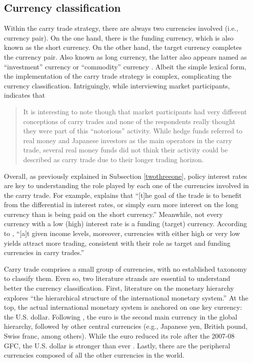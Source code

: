 \documentclass[a4paper, twoside]{templates/ociamthesis}
\begin{document}
\hypertarget{twothreefive}{%
\subsection{Currency classification}\label{twothreefive}}

\noindent Within the carry trade strategy, there are always two currencies involved (i.e., currency pair). On the one hand, there is the funding currency, which is also known as the short currency. On the other hand, the target currency completes the currency pair. Also known as long currency, the latter also appears named as ``investment'' currency \autocite[e.g.,][ 313]{brunnermeier2008} or ``commodity'' currency \autocite[ 80]{rossi2012}. Albeit the simple lexical form, the implementation of the carry trade strategy is complex, complicating the currency classification. Intriguingly, while interviewing market participants, \textcite[ 220]{kaltenbrunner2011} indicates that

\begin{quote}
It is interesting to note though that market participants had very different conceptions of carry trades and none of the respondents really thought they were part of this ``notorious'' activity. While hedge funds referred to real money and Japanese investors as the main operators in the carry trade, several real money funds did not think their activity could be described as carry trade due to their longer trading horizon.
\end{quote}

Overall, as previously explained in Subsection \ref{twothreeone}, policy interest rates are key to understanding the role played by each one of the currencies involved in the carry trade. For example, \textcite[ 37]{garner2012} explains that ``{[}t{]}he goal of the trade is to benefit from the differential in interest rates, or simply earn more interest on the long currency than is being paid on the short currency.'' Meanwhile, not every currency with a low (high) interest rate is a funding (target) currency. According to \textcite[ 87]{mccauley2011}, ``{[}a{]}t given income levels, moreover, currencies with either high or very low yields attract more trading, consistent with their role as target and funding currencies in carry trades.''

Carry trade comprises a small group of currencies, with no established taxonomy to classify them. Even so, two literature strands are essential to understand better the currency classification. First, literature on the monetary hierarchy explores ``the hierarchical structure of the international monetary system.'' \autocite[ 187]{depaula2017} At the top, the actual international monetary system is anchored on one key currency: the U.S. dollar. Following \textcite[ 52]{deconti2013}, the euro is the second main currency in the global hierarchy, followed by other central currencies (e.g., Japanese yen, British pound, Swiss franc, among others). While the euro reduced its role after the 2007-08 GFC, the U.S. dollar is stronger than ever \autocites[see][]{ilzetzki2019,maggiori2019}. Lastly, there are the peripheral currencies composed of all the other currencies in the world.
\end{document}
